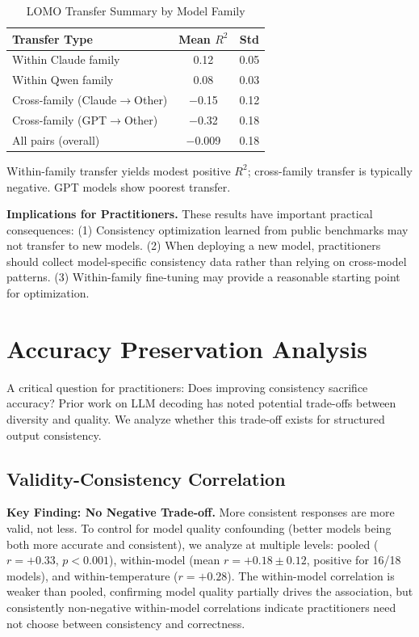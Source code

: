 \documentclass[sigconf,anonymous,review]{acmart}
\begin{document}
\begin{table}[t]
\centering
\caption{LOMO Transfer Summary by Model Family}
\label{tab:lomo_summary}
\small
\begin{tabular}{@{}lcc@{}}
\toprule
\textbf{Transfer Type} & \textbf{Mean $R^2$} & \textbf{Std} \\
\midrule
Within Claude family & 0.12 & 0.05 \\
Within Qwen family & 0.08 & 0.03 \\
Cross-family (Claude$\rightarrow$Other) & $-$0.15 & 0.12 \\
Cross-family (GPT$\rightarrow$Other) & $-$0.32 & 0.18 \\
All pairs (overall) & $-$0.009 & 0.18 \\
\bottomrule
\end{tabular}
\vspace{0.3em}

\raggedright\footnotesize Within-family transfer yields modest positive $R^2$; cross-family transfer is typically negative. GPT models show poorest transfer.
\end{table}

\textbf{Implications for Practitioners.} These results have important practical consequences: (1) Consistency optimization learned from public benchmarks may not transfer to new models. (2) When deploying a new model, practitioners should collect model-specific consistency data rather than relying on cross-model patterns. (3) Within-family fine-tuning may provide a reasonable starting point for optimization.

\section{Accuracy Preservation Analysis}
\label{sec:accuracy}

A critical question for practitioners: Does improving consistency sacrifice accuracy? Prior work on LLM decoding has noted potential trade-offs between diversity and quality. We analyze whether this trade-off exists for structured output consistency.

\subsection{Validity-Consistency Correlation}

\textbf{Key Finding: No Negative Trade-off.} More consistent responses are more valid, not less. To control for model quality confounding (better models being both more accurate and consistent), we analyze at multiple levels: pooled ($r = +0.33$, $p < 0.001$), within-model (mean $r = +0.18 \pm 0.12$, positive for 16/18 models), and within-temperature ($r = +0.28$). The within-model correlation is weaker than pooled, confirming model quality partially drives the association, but consistently non-negative within-model correlations indicate practitioners need not choose between consistency and correctness.
\end{document}
